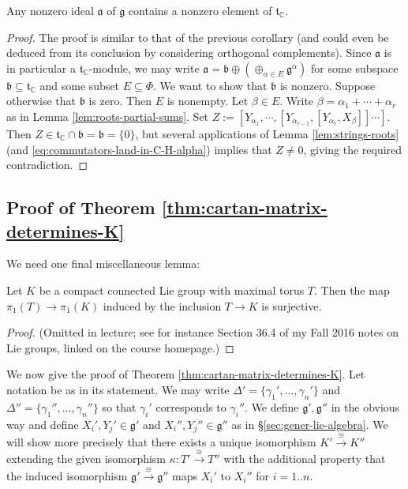 \documentclass[reqno]{amsart} 
\begin{document}
\begin{corollary}\label{cor:nonzero-ideals-detected-via-t}
  Any nonzero ideal $\mathfrak{a}$ of $\mathfrak{g}$ contains a nonzero element of $\mathfrak{t}_{\mathbb{C}}$.
\end{corollary}
\begin{proof}
  The proof is similar to that of the previous corollary (and could even be deduced from its conclusion by considering orthogonal complements).  Since $\mathfrak{a}$ is in particular a $\mathfrak{t}_{\mathbb{C}}$-module, we may write $\mathfrak{a} = \mathfrak{b} \oplus (\oplus_{\alpha \in E} \mathfrak{g}^{\alpha})$ for some subspace $\mathfrak{b} \subseteq \mathfrak{t}_{\mathbb{C}}$ and some subset $E \subseteq \Phi$.  We want to show that $\mathfrak{b}$ is nonzero.  Suppose otherwise that $\mathfrak{b}$ is zero.  Then $E$ is nonempty.  Let $\beta \in E$.  Write $\beta = \alpha_1 + \dotsb + \alpha_r$ as in Lemma \ref{lem:roots-partial-sums}.  Set $Z := [Y_{\alpha_1}, \dotsb, [Y_{\alpha_{r-1}}, [Y_{\alpha_r}, X_{\beta}]] \dotsb ]$.  Then $Z \in \mathfrak{t}_{\mathbb{C}} \cap \mathfrak{b} = \mathfrak{b} = \{0\}$, but several applications of Lemma \ref{lem:strings-roots} (and \eqref{eq:commutators-land-in-C-H-alpha}) implies that $Z \neq 0$, giving the required contradiction.
\end{proof}

\subsection{Proof of Theorem
  \ref{thm:cartan-matrix-determines-K}}
We need one final miscellaneous lemma:
\begin{lemma}\label{lem:pi-1-T-onto-pi-1-K}
  Let $K$ be a compact connected Lie group with maximal torus $T$.  Then the map $\pi_1(T) \rightarrow \pi_1(K)$ induced by the inclusion $T \rightarrow K$ is surjective.
\end{lemma}
\begin{proof}
  (Omitted in lecture; see for instance Section 36.4 of my Fall 2016 notes on Lie groups, linked on the course homepage.)
\end{proof}

We now give the proof of Theorem \ref{thm:cartan-matrix-determines-K}.  Let notation be as in its statement.  We may write $\Delta ' = \{\gamma_1 ', \dotsc, \gamma_n' \}$ and $\Delta '' = \{\gamma_1'', \dotsc, \gamma_n''\}$ so that $\gamma_i'$ corresponds to $\gamma_i''$.  We define $\mathfrak{g} ', \mathfrak{g} ''$ in the obvious way and define $X_i', Y_j' \in \mathfrak{g} '$ and $X_i'', Y_j'' \in \mathfrak{g} ''$ as in \S\ref{sec:gener-lie-algebra}.  We will show more precisely that there exists a unique isomorphism $K' \xrightarrow{\cong } K''$ extending the given isomorphism $\kappa : T' \xrightarrow{\cong } T''$ with the additional property that the induced isomorphism $\mathfrak{g} ' \xrightarrow{\cong } \mathfrak{g} ''$ maps $X_i'$ to $X_i''$ for $i=1..n$.
\end{document}
